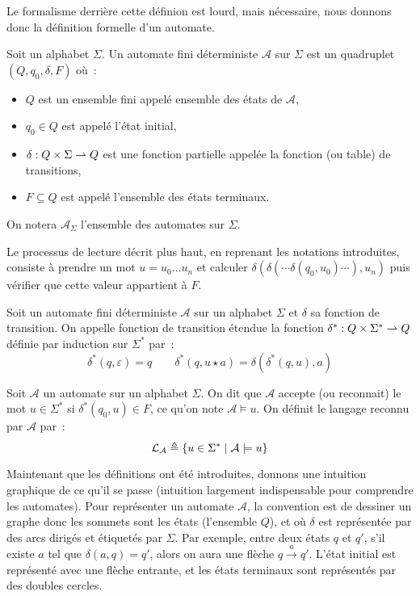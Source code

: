 Le formalisme derrière cette définion est lourd, mais nécessaire, nous donnons
donc la définition formelle d'un automate.

\begin{definition}
  Soit un alphabet $\Sigma$. Un automate fini déterministe $\mathcal A$ sur
  $\Sigma$ est un quadruplet $(Q,q_0,\delta,F)$ où~:
  \begin{itemize}
  \item $Q$ est un ensemble fini appelé ensemble des états de $\mathcal A$,
  \item $q_0 \in Q$ est appelé l'état initial,
  \item $\delta : Q\times \Sigma \rightharpoonup Q$ est une fonction partielle
    appelée la fonction (ou table) de transitions,
  \item $F \subseteq Q$ est appelé l'ensemble des états terminaux.
  \end{itemize}

  On notera $\mathcal A_\Sigma$ l'ensemble des automates sur $\Sigma$.
\end{definition}

Le processus de lecture décrit plus haut, en reprenant les notations
introduites, consiste à prendre un mot $u = u_0\ldots u_n$ et calculer
$\delta(\delta(\cdots\delta(q_0,u_0)\cdots),u_n)$ puis vérifier que cette
valeur appartient à $F$.

\begin{definition}
  Soit un automate fini déterministe $\mathcal A$ sur un alphabet $\Sigma$ et
  $\delta$ sa fonction de transition. On appelle fonction de transition
  étendue la fonction $\delta^* : Q \times \Sigma^* \rightharpoonup Q$ définie par
  induction sur $\Sigma^*$ par~:
  \[\delta^* (q,\varepsilon) = q \qquad
  \delta^* (q,u\star a) = \delta(\delta^*(q,u),a)\]
\end{definition}

\begin{definition}
  Soit $\mathcal A$ un automate sur un alphabet $\Sigma$. On dit que
  $\mathcal A$ accepte (ou reconnait) le mot $u \in \Sigma^*$ si
  $\delta^*(q_0,u) \in F$, ce qu'on note $\mathcal A \models u$. On définit le
  langage reconnu par $\mathcal A$ par~:
  \[\mathcal L_\mathcal A \triangleq \{u \in \Sigma^* \mid \mathcal A \models u\}\]
\end{definition}

Maintenant que les définitions ont été introduites, donnons une intuition
graphique de ce qu'il se passe (intuition largement indispensable pour
comprendre les automates). Pour représenter un automate $\mathcal A$, la
convention est de dessiner un graphe donc les sommets sont les états (l'ensemble
$Q$), et où $\delta$ est représentée par des arcs dirigés et étiquetés par
$\Sigma$. Par exemple, entre deux états $q$ et $q'$, s'il existe $a$ tel que
$\delta(a,q) = q'$, alors on aura une flèche $q \xrightarrow{a} q'$. L'état
initial est représenté avec une flèche entrante, et les états terminaux sont
représentés par des doubles cercles.

